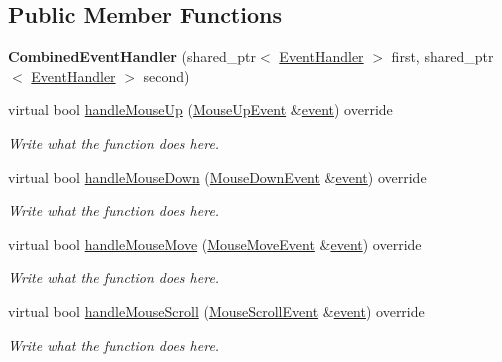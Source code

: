 \subsection*{Public Member Functions}
\begin{DoxyCompactItemize}
\item 
\hypertarget{classCombinedEventHandler_ad45f2a5d0eb584f62d94de4c3d589a80}{{\bfseries Combined\+Event\+Handler} (shared\+\_\+ptr$<$ \hyperlink{structEventHandler}{Event\+Handler} $>$ first, shared\+\_\+ptr$<$ \hyperlink{structEventHandler}{Event\+Handler} $>$ second)}\label{classCombinedEventHandler_ad45f2a5d0eb584f62d94de4c3d589a80}

\item 
virtual bool \hyperlink{classCombinedEventHandler_a89f264f41a9de7162618e7549b24c82d}{handle\+Mouse\+Up} (\hyperlink{structMouseUpEvent}{Mouse\+Up\+Event} \&\hyperlink{unionSDL__Event}{event}) override
\begin{DoxyCompactList}\small\item\em Write what the function does here. \end{DoxyCompactList}\item 
virtual bool \hyperlink{classCombinedEventHandler_a7b4e923b77ac7c961d9919e4f169bf1a}{handle\+Mouse\+Down} (\hyperlink{structMouseDownEvent}{Mouse\+Down\+Event} \&\hyperlink{unionSDL__Event}{event}) override
\begin{DoxyCompactList}\small\item\em Write what the function does here. \end{DoxyCompactList}\item 
virtual bool \hyperlink{classCombinedEventHandler_ae7678e61d3ac2b416307bc5d4797fcdf}{handle\+Mouse\+Move} (\hyperlink{structMouseMoveEvent}{Mouse\+Move\+Event} \&\hyperlink{unionSDL__Event}{event}) override
\begin{DoxyCompactList}\small\item\em Write what the function does here. \end{DoxyCompactList}\item 
virtual bool \hyperlink{classCombinedEventHandler_a3f1d2344f2348a83242576eb9f9f81f6}{handle\+Mouse\+Scroll} (\hyperlink{structMouseScrollEvent}{Mouse\+Scroll\+Event} \&\hyperlink{unionSDL__Event}{event}) override
\begin{DoxyCompactList}\small\item\em Write what the function does here. \end{DoxyCompactList}\item 

\end{DoxyCompactItemize}
